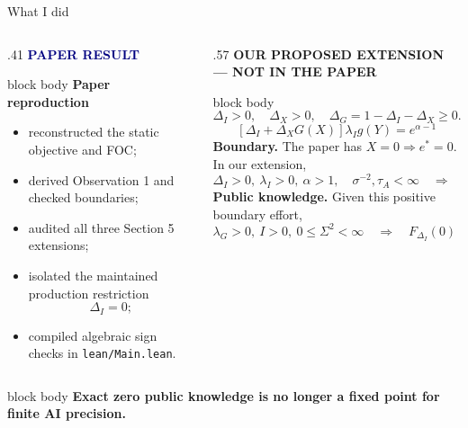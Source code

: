 \documentclass[aspectratio=169,10pt]{beamer}
\newcommand{\paperlabel}{\textcolor{Navy}{\scriptsize\bfseries PAPER RESULT}}
\newcommand{\extlabel}{\textcolor{Alert}{\scriptsize\bfseries OUR PROPOSED EXTENSION --- NOT IN THE PAPER}}
\begin{document}
\begin{frame}{What I did}
  \begin{columns}[T,onlytextwidth]
    \begin{column}{.41\textwidth}
      \paperlabel
      \vspace{.12cm}
      \begin{beamercolorbox}[rounded=true,sep=.6em]{block body}
      \textbf{Paper reproduction}
      \begin{itemize}\footnotesize
        \item reconstructed the static objective and FOC;
        \item derived Observation 1 and checked boundaries;
        \item audited all three Section 5 extensions;
        \item isolated the maintained production restriction
          \[\Delta_I=0;\]
        \item compiled algebraic sign checks in \texttt{lean/Main.lean}.
      \end{itemize}
      \end{beamercolorbox}
    \end{column}

    \begin{column}{.57\textwidth}
      \extlabel
      \vspace{.12cm}
      \begin{beamercolorbox}[rounded=true,sep=.55em]{block body}
      \small
      \[
      \Delta_I>0,\quad \Delta_X>0,\quad
      \Delta_G=1-\Delta_I-\Delta_X\ge0.
      \]
      \[
        \boxed{[\Delta_I+\Delta_XG(X)]\lambda_Ig(Y)=e^{\alpha-1}}
      \]
      \footnotesize\textbf{Boundary.} The paper has $X=0\Rightarrow e^*=0$.
      In our extension,
      \[
        \Delta_I>0,\ \lambda_I>0,\ \alpha>1,\quad
        \sigma^{-2},\tau_A<\infty
        \quad\Rightarrow\quad e^*(0,\tau_A)>0.
      \]
      \textbf{Public knowledge.} Given this positive boundary effort,
      \[
        \lambda_G>0,\ I>0,\ 0\le\Sigma^2<\infty
        \quad\Rightarrow\quad F_{\Delta_I}(0)>0.
      \]
      \end{beamercolorbox}
    \end{column}
  \end{columns}

  \vspace{.2cm}
  \begin{beamercolorbox}[rounded=true,sep=.55em]{block body}
    \centering\bfseries Exact zero public knowledge is no longer a fixed point
    for finite AI precision.
  \end{beamercolorbox}
\end{frame}
\end{document}
